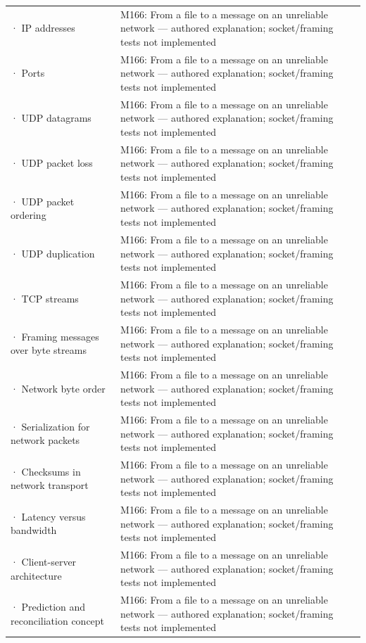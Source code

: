 {\begin{longtable}[]{@{}
  >{\raggedright\arraybackslash}p{}
  >{\raggedright\arraybackslash}p{}@{}}
2757 · IP addresses & M166: From a file to a message on an unreliable network --- authored explanation; socket/framing tests not implemented \\
2758 · Ports & M166: From a file to a message on an unreliable network --- authored explanation; socket/framing tests not implemented \\
2759 · UDP datagrams & M166: From a file to a message on an unreliable network --- authored explanation; socket/framing tests not implemented \\
2760 · UDP packet loss & M166: From a file to a message on an unreliable network --- authored explanation; socket/framing tests not implemented \\
2761 · UDP packet ordering & M166: From a file to a message on an unreliable network --- authored explanation; socket/framing tests not implemented \\
2762 · UDP duplication & M166: From a file to a message on an unreliable network --- authored explanation; socket/framing tests not implemented \\
2763 · TCP streams & M166: From a file to a message on an unreliable network --- authored explanation; socket/framing tests not implemented \\
2764 · Framing messages over byte streams & M166: From a file to a message on an unreliable network --- authored explanation; socket/framing tests not implemented \\
2765 · Network byte order & M166: From a file to a message on an unreliable network --- authored explanation; socket/framing tests not implemented \\
2766 · Serialization for network packets & M166: From a file to a message on an unreliable network --- authored explanation; socket/framing tests not implemented \\
2767 · Checksums in network transport & M166: From a file to a message on an unreliable network --- authored explanation; socket/framing tests not implemented \\
2768 · Latency versus bandwidth & M166: From a file to a message on an unreliable network --- authored explanation; socket/framing tests not implemented \\
2769 · Client-server architecture & M166: From a file to a message on an unreliable network --- authored explanation; socket/framing tests not implemented \\
2770 · Prediction and reconciliation concept & M166: From a file to a message on an unreliable network --- authored explanation; socket/framing tests not implemented \\

\end{longtable}}
